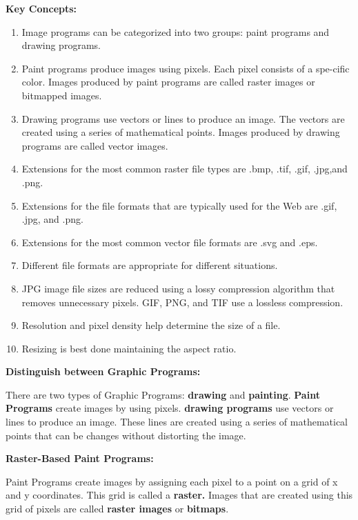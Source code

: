 \documentclass{report}
\begin{document}
    \bigbreak \noindent \bigbreak \noindent 
    \begin{Large}
        \textbf{Key Concepts:}
    \end{Large} 
    \begin{enumerate}
        \item  Image programs can be categorized into two groups: paint programs and drawing programs. 
        \item Paint programs produce images using pixels. Each pixel consists of a spe-cific color. Images produced by paint programs are called raster images or bitmapped images. 
        \item Drawing programs use vectors or lines to produce an image. The vectors are created using a series of mathematical points. Images produced by drawing programs are called vector images. 
        \item Extensions for the most common raster file types are .bmp, .tif, .gif, .jpg,and .png. 
        \item Extensions for the file formats that are typically used for the Web are .gif, .jpg, and .png. 
        \item Extensions for the most common vector file formats are .svg and .eps.  
        \item Different file formats are appropriate for different situations. 
        \item JPG image file sizes are reduced using a lossy compression algorithm  that removes unnecessary pixels. GIF, PNG, and TIF use a lossless  compression. 
        \item Resolution and pixel density help determine the size of a file. 
        \item Resizing is best done maintaining the aspect ratio.
    \end{enumerate}

    \pagebreak
    \begin{Large}
        \noindent \textbf{Distinguish between Graphic Programs:}
    \end{Large}
    
    \bigbreak \noindent 
    There are two types of Graphic Programs: \textbf{drawing} and \textbf{painting}. \textbf{Paint Programs}
    create images by using pixels. \textbf{drawing programs} use vectors or lines to produce an image.
    These lines are created using a series of mathematical points that can be changes without
    distorting the image.

    \bigbreak \noindent \bigbreak \noindent \bigbreak \noindent 
    \begin{large}
        \textbf{Raster-Based Paint Programs:}
    \end{large}
    \bigbreak \noindent 
    Paint Programs create images by assigning each pixel to a point on a grid of x and y coordinates. 
    This grid is called a \textbf{raster.} Images that are created using this grid of pixels 
    are called \textbf{raster images} or \textbf{bitmaps}.
\end{document}
